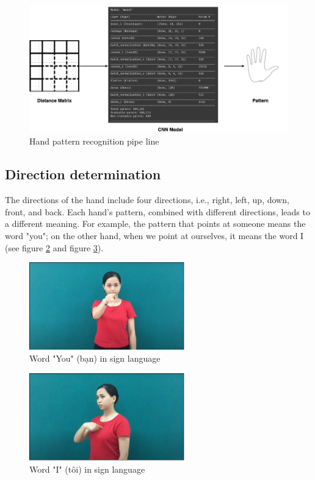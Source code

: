 \begin{figure}[H]
	\centering
	\includegraphics[width=\textwidth]{img/Chap4/Hand-Pattern-Reg-Model.png}
	\caption{Hand pattern recognition pipe line}
	\label{fig:Chap4-StructureOfConvolutionalNeuralNetwork}
\end{figure}

\subsection{Direction determination}

The directions of the hand include four directions, i.e., right, left, up, down, front, and back. Each hand's pattern, combined with different directions, leads to a different meaning. For example, the pattern that points at someone means the word "you"; on the other hand, when we point at ourselves, it means the word I (see figure \ref{fig:Chap4-WordYouInSignLanguage} and figure \ref{fig:Chap4-WordIInSignLanguage}).

\begin{figure}[H]
	\centering
	\includegraphics[width=0.6\textwidth]{img/Chap4/WordYouInSignLanguage.png}
	\caption{Word "You" (bạn) in sign language}
	\label{fig:Chap4-WordYouInSignLanguage}
\end{figure}

\begin{figure}[H]
	\centering
	\includegraphics[width=0.6\textwidth]{img/Chap4/WordIInSignLanguage.png}
	\caption{Word "I" (tôi) in sign language}
	\label{fig:Chap4-WordIInSignLanguage}
\end{figure}

